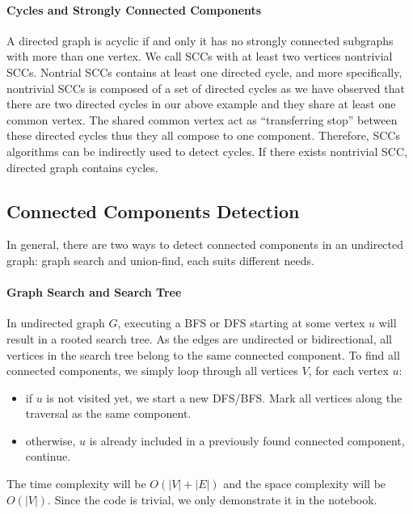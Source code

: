 \documentclass[../main.tex]{subfiles}
\begin{document}
\paragraph{Cycles and Strongly Connected Components} A directed graph is acyclic if and only it has no strongly connected subgraphs with more than one vertex. We call SCCs with at least two vertices nontrivial SCCs. Nontrial SCCs contains at least one directed cycle, and  more specifically, nontrivial SCCs is composed of a set of directed cycles as we have observed that there are two directed cycles in our above example and they share at least one common vertex. The shared common vertex act as ``transferring stop'' between these directed cycles thus they all compose to one component. Therefore, SCCs algorithms can be indirectly used to detect cycles. If there exists nontrivial SCC, directed graph contains cycles. 

\subsection{Connected Components Detection}
In general, there are two ways to detect connected components in an undirected graph: graph search and union-find, each suits different needs.
\paragraph{Graph Search and Search Tree} In  undirected graph $G$, executing a BFS or DFS starting at some vertex  $u$ will result in a rooted search tree. As the edges are undirected or bidirectional, all vertices in the search tree belong to the same connected component. To find all connected components, we simply loop through all vertices $V$, for each vertex $u$:
\begin{itemize}
    \item if $u$ is not visited yet, we start a new DFS/BFS. Mark all vertices along the traversal as the same component.
    \item otherwise, $u$ is already included in a previously found connected component, continue.
\end{itemize} 
The time complexity will be $O(|V|+|E|)$ and the space complexity will be $O(|V|)$. Since the code is trivial, we only demonstrate it in the notebook.
\end{document}
